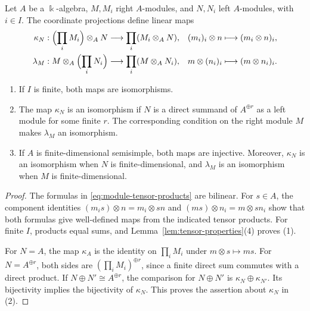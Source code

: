 \begin{advanced}
\begin{proposition}\label{prop:tensor-direct-products}
Let $A$ be a $\Bbbk$-algebra, $M,M_i$ right $A$-modules, and $N,N_i$ left $A$-modules, with $i\in I$.
The coordinate projections define linear maps
\begin{equation}\label{eq:module-tensor-products}
\begin{aligned}
\kappa_N:\Bigl(\prod_iM_i\Bigr)\otimes_A N
&\longrightarrow\prod_i(M_i\otimes_A N),
& (m_i)_i\otimes n&\longmapsto(m_i\otimes n)_i,\\
\lambda_M:M\otimes_A\Bigl(\prod_iN_i\Bigr)
&\longrightarrow\prod_i(M\otimes_A N_i),
& m\otimes(n_i)_i&\longmapsto(m\otimes n_i)_i.
\end{aligned}
\end{equation}
\begin{enumerate}
\item If $I$ is finite, both maps are isomorphisms.
\item The map $\kappa_N$ is an isomorphism if $N$ is a direct summand of $A^{\oplus r}$ as a left module for some finite $r$.
The corresponding condition on the right module $M$ makes $\lambda_M$ an isomorphism.
\item If $A$ is finite-dimensional semisimple, both maps are injective.
Moreover, $\kappa_N$ is an isomorphism when $N$ is finite-dimensional, and $\lambda_M$ is an isomorphism when $M$ is finite-dimensional.
\end{enumerate}
\end{proposition}

\begin{proof}
The formulas in \eqref{eq:module-tensor-products} are bilinear. For $s\in A$, the component identities
$(m_is)\otimes n=m_i\otimes sn$ and $(ms)\otimes n_i=m\otimes sn_i$
show that both formulas give well-defined maps from the indicated tensor products.
For finite $I$, products equal sums, and Lemma~\ref{lem:tensor-properties}(4) proves (1).

For $N=A$, the map $\kappa_A$ is the identity on $\prod_iM_i$ under $m\otimes s\mapsto ms$.
For $N=A^{\oplus r}$, both sides are $(\prod_iM_i)^{\oplus r}$, since a finite direct sum commutes with a direct product.
If $N\oplus N'\cong A^{\oplus r}$, the comparison for $N\oplus N'$ is $\kappa_N\oplus\kappa_{N'}$.
Its bijectivity implies the bijectivity of $\kappa_N$.
This proves the assertion about $\kappa_N$ in (2).


\end{proof}
\end{advanced}
